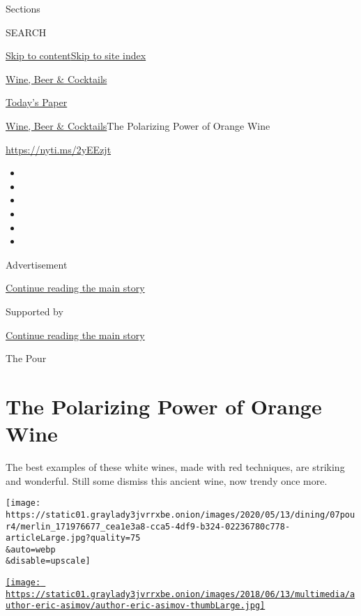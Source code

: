 Sections

SEARCH

\protect\hyperlink{site-content}{Skip to
content}\protect\hyperlink{site-index}{Skip to site index}

\href{https://www.nytimes3xbfgragh.onion/section/food/drinks}{Wine, Beer
\& Cocktails}

\href{https://myaccount.nytimes3xbfgragh.onion/auth/login?response_type=cookie\&client_id=vi}{}

\href{https://www.nytimes3xbfgragh.onion/section/todayspaper}{Today's
Paper}

\href{/section/food/drinks}{Wine, Beer \& Cocktails}\textbar{}The
Polarizing Power of Orange Wine

\url{https://nyti.ms/2yEEzjt}

\begin{itemize}
\item
\item
\item
\item
\item
\item
\end{itemize}

Advertisement

\protect\hyperlink{after-top}{Continue reading the main story}

Supported by

\protect\hyperlink{after-sponsor}{Continue reading the main story}

The Pour

\hypertarget{the-polarizing-power-of-orange-wine}{%
\section{The Polarizing Power of Orange
Wine}\label{the-polarizing-power-of-orange-wine}}

The best examples of these white wines, made with red techniques, are
striking and wonderful. Still some dismiss this ancient wine, now trendy
once more.

\texttt{[image: https://static01.graylady3jvrrxbe.onion/images/2020/05/13/dining/07pour4/merlin\_171976677\_cea1e3a8-cca5-4df9-b324-02236780c778-articleLarge.jpg?quality=75\\\&auto=webp\\\&disable=upscale]}

\href{https://www.nytimes3xbfgragh.onion/by/eric-asimov}{\texttt{[image: https://static01.graylady3jvrrxbe.onion/images/2018/06/13/multimedia/author-eric-asimov/author-eric-asimov-thumbLarge.jpg]}}

